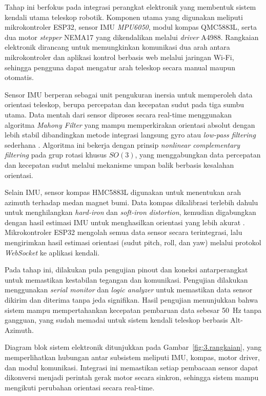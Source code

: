 Tahap ini berfokus pada integrasi perangkat elektronik yang membentuk sistem kendali utama teleskop robotik. Komponen utama yang digunakan meliputi mikrokontroler ESP32, sensor IMU \textit{MPU6050}, modul kompas QMC5883L, serta dua motor \textit{stepper} NEMA17 yang dikendalikan melalui \textit{driver} A4988. Rangkaian elektronik dirancang untuk memungkinkan komunikasi dua arah antara mikrokontroler dan aplikasi kontrol berbasis web melalui jaringan Wi-Fi, sehingga pengguna dapat mengatur arah teleskop secara manual maupun otomatis.

\par
Sensor IMU berperan sebagai unit pengukuran inersia untuk memperoleh data orientasi teleskop, berupa percepatan dan kecepatan sudut pada tiga sumbu utama. Data mentah dari sensor diproses secara real-time menggunakan algoritma \textit{Mahony Filter} yang mampu memperkirakan orientasi absolut dengan lebih stabil dibandingkan metode integrasi langsung gyro atau \textit{low-pass filtering} sederhana \cite{Mahony2008}. Algoritma ini bekerja dengan prinsip \textit{nonlinear complementary filtering} pada grup rotasi khusus $SO(3)$, yang menggabungkan data percepatan dan kecepatan sudut melalui mekanisme umpan balik berbasis kesalahan orientasi.

\par
Selain IMU, sensor kompas HMC5883L digunakan untuk menentukan arah azimuth terhadap medan magnet bumi. Data kompas dikalibrasi terlebih dahulu untuk menghilangkan \textit{hard-iron} dan \textit{soft-iron distortion}, kemudian digabungkan dengan hasil estimasi IMU untuk menghasilkan orientasi yang lebih akurat \cite{Hoang2020}. Mikrokontroler ESP32 mengolah semua data sensor secara terintegrasi, lalu mengirimkan hasil estimasi orientasi (sudut pitch, roll, dan yaw) melalui protokol \textit{WebSocket} ke aplikasi kendali.

\par
Pada tahap ini, dilakukan pula pengujian pinout dan koneksi antarperangkat untuk memastikan kestabilan tegangan dan komunikasi. Pengujian dilakukan menggunakan \textit{serial monitor} dan \textit{logic analyzer} untuk memastikan data sensor dikirim dan diterima tanpa jeda signifikan. Hasil pengujian menunjukkan bahwa sistem mampu mempertahankan kecepatan pembaruan data sebesar 50~Hz tanpa gangguan, yang sudah memadai untuk sistem kendali teleskop berbasis Alt-Azimuth.

\par
Diagram blok sistem elektronik ditunjukkan pada Gambar~\ref{fig:3.rangkaian}, yang memperlihatkan hubungan antar subsistem meliputi IMU, kompas, motor driver, dan modul komunikasi. Integrasi ini memastikan setiap pembacaan sensor dapat dikonversi menjadi perintah gerak motor secara sinkron, sehingga sistem mampu mengikuti perubahan orientasi secara real-time.

